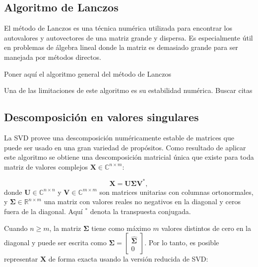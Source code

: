 \subsection*{Algoritmo de Lanczos}\label{subsec:lanczos}

El método de Lanczos es una técnica numérica utilizada para encontrar los autovalores y autovectores de una matriz grande y dispersa. Es especialmente útil en problemas de álgebra lineal donde la matriz es demasiado grande para ser manejada por métodos directos.

\alert{Poner aquí el algoritmo general del método de Lanczos}

Una de las limitaciones de este algoritmo es su estabilidad numérica. \alert{Buscar citas} %

\subsection*{Descomposición en valores singulares}\label{subsec:svd}

La SVD provee una descomposición numéricamente estable de matrices que puede ser usado en una gran variedad de propósitos. Como resultado de aplicar este algoritmo se obtiene una descomposición matricial única que existe para toda matriz de valores complejos $\mathbf{X} \in \mathbb{C}^{n \times m}$:

\begin{equation}
	\mathbf{X} = \mathbf{U} \mathbf{\Sigma} \mathbf{V}^*,
\end{equation}
donde $\mathbf{U} \in \mathbb{C}^{n \times n}$ y $\mathbf{V} \in \mathbb{C}^{m \times m}$ son matrices unitarias con columnas ortonormales, y $\mathbf{\Sigma} \in \mathbb{R}^{n \times m}$ una matriz con valores reales no negativos en la diagonal y ceros fuera de la diagonal. Aquí $^*$ denota la transpuesta conjugada.

Cuando $n \ge m$, la matriz $\mathbf{\Sigma}$ tiene como máximo $m$ valores distintos de cero en la diagonal y puede ser escrita como $\mathbf{\Sigma} = \begin{bmatrix}\hat{\mathbf{\Sigma}} \\ 0\end{bmatrix}$. Por lo tanto, es posible representar $\mathbf{X}$ de forma exacta usando la versión reducida de SVD:

